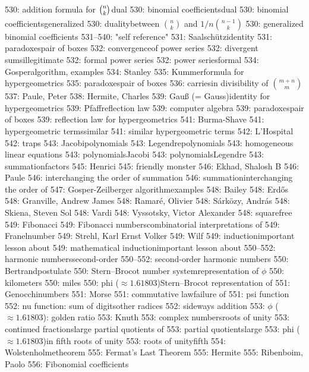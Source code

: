 530: addition formula for ${n\choose k}_{\mathstrut}$\sub dual
530: binomial coefficients\sub dual
530: binomial coefficients\sub generalized
530: duality\sub between $n\choose k$ and $1/n{n-1\choose k}$
530: generalized binomial coefficients
531--540: "self reference"
531: Saalsch\"utz\sub identity
531: paradoxes\sub pair of boxes
532: convergence\sub of power series
532: divergent sums\sub illegitimate
532: formal power series
532: power series\sub formal
534: Gosper\sub algorithm, examples
534: Stanley
535: Kummer\sub formula for hypergeometrics
535: paradoxes\sub pair of boxes
536: carries\sub in divisibility of $m+n\choose m$
537: Paule, Peter
538: Hermite, Charles
539: Gau{\ss} (= Gauss)\sub identity for hypergeometrics
539: Pfaff\sub reflection law
539: computer algebra
539: paradoxes\sub pair of boxes
539: reflection law for hypergeometrics
541: Burma-Shave
541: hypergeometric terms\sub similar
541: similar hypergeometric terms
542: L'Hospital
542: traps
543: Jacobi\sub polynomials
543: Legendre\sub polynomials
543: homogeneous linear equations
543: polynomials\sub Jacobi
543: polynomials\sub Legendre
543: summation\sub factors
545: Henrici
545: friendly monster
546: Ekhad, Shalosh B
546: Paule
546: interchanging the order of summation
546: summation\sub interchanging the order of
547: Gosper-Zeilberger algorithm\sub examples
548: Bailey
548: Erd\H os
548: Granville, Andrew James
548: Ramar\'e, Olivier
548: S\'ark\"ozy, Andr\'as
548: Skiena, Steven Sol
548: Vardi
548: Vyssotsky, Victor Alexander
548: squarefree
549: Fibonacci
549: Fibonacci numbers\sub combinatorial interpretations of
549: Franel\sub number
549: Strehl, Karl Ernst Volker
549: Wilf
549: induction\sub important lesson about
549: mathematical induction\sub important lesson about
550--552: harmonic numbers\sub second-order
550--552: second-order harmonic numbers
550: Bertrand\sub postulate
550: Stern--Brocot number system\sub representation of $\phi$
550: kilometers
550: miles
550: phi ($\approx1.61803$)\sub Stern--Brocot representation of
551: Genocchi\sub numbers
551: Morse
551: commutative law\sub failure of
551: psi function
552: nu function: sum of digits\sub other radices
552: sideways addition
553: $\phi$ ($\approx1.61803$): golden ratio
553: Knuth
553: complex numbers\sub roots of unity
553: continued fractions\sub large partial quotients of
553: partial quotients\sub large
553: phi ($\approx1.61803$)\sub in fifth roots of unity
553: roots of unity\sub fifth
554: Wolstenholme\sub theorem
555: Fermat's Last Theorem
555: Hermite
555: Ribenboim, Paolo
556: Fibonomial coefficients
